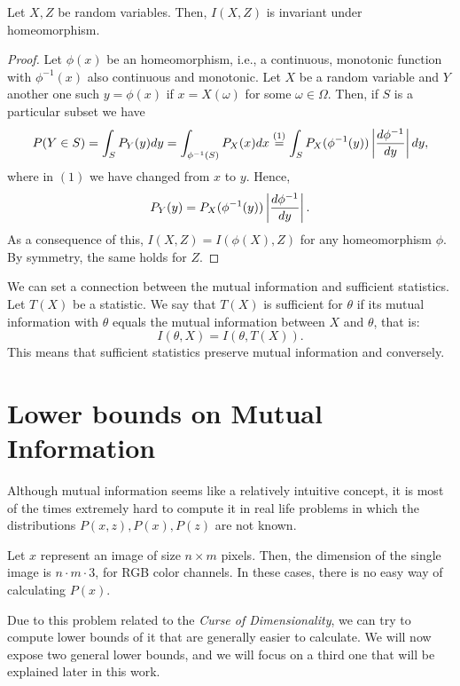 \begin{nprop}
Let $X,Z$ be random variables. Then, $I(X,Z)$ is invariant under homeomorphism.
\end{nprop}
\begin{proof}
Let $\phi(x)$ be an homeomorphism, i.e., a continuous, monotonic function with $\phi^{-1}(x)$ also continuous and monotonic. Let $X$ be a random variable and $Y$ another one such $y = \phi(x)$ if $x = X(\omega)$ for some $\omega \in \Omega$. Then, if $S$ is a particular subset we have 
\[
P(Y \in S) = \int_S P_Y(y) dy = \int_{\phi^{-1}(S)}P_X(x) dx \stackrel{(1)}{=} \int_S P_X(\phi^{-1}(y)) \left\lvert \frac{d \phi^{-1}}{dy}\right\rvert dy,
\]
where in $(1)$ we have changed from $x$ to $y$. Hence, 
\[
P_Y(y) = P_X(\phi^{-1}(y))\left\lvert\frac{d \phi^{-1}}{dy}\right\rvert.
\]
As a consequence of this, $I(X,Z) = I(\phi(X),Z) $ for any homeomorphism $\phi$. By symmetry, the same holds for $Z$.

\end{proof}

\begin{remark} We can set a connection between the mutual information and sufficient statistics. Let $T(X)$ be a statistic. We say that $T(X)$  is sufficient for $\theta$ if its mutual information with $\theta$ equals the mutual information between $X$ and $\theta$, that is:
$$
I(\theta, X) = I (\theta, T(X)).
$$
This means that sufficient statistics preserve mutual information and conversely.
\end{remark}

\section{Lower bounds on Mutual Information}

Although mutual information seems like a relatively intuitive concept, it is most of the times extremely hard to compute it in real life problems in which the distributions $P(x,z),P(x),P(z)$ are not known.

\begin{nexample}
Let $x$ represent an image of size $n \times m$ pixels. Then, the dimension of the single image is $n \cdot m \cdot 3$, for RGB color channels. In these cases, there is no easy way of calculating $P(x)$.
\end{nexample}

Due to this problem related to the \emph{Curse of Dimensionality}, we can try to compute lower bounds of it that are generally easier to calculate. We will now expose two general lower bounds, and we will focus on a third one that will be explained later in this work.

